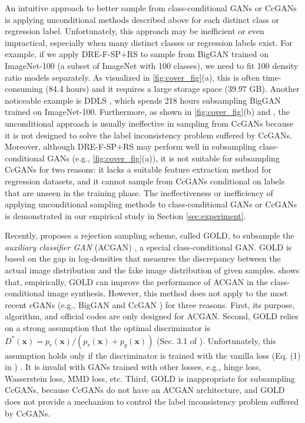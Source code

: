 \documentclass[final,12pt, 3p,times]{elsarticle}
\begin{document}
An intuitive approach to better sample from class-conditional GANs or CcGANs is applying unconditional methods described above for each distinct class or regression label. Unfortunately, this approach may be inefficient or even impractical, especially when many distinct classes or regression labels exist. For example, if we apply DRE-F-SP+RS \cite{ding2020subsampling} to sample from BigGAN \cite{brock2018large} trained on ImageNet-100 \cite{cao2017hashnet} (a subset of ImageNet \cite{imagenet_cvpr09} with 100 classes), we need to fit 100 density ratio models separately. As visualized in \cref{fig:cover_fig}(a), this is often time-consuming (84.4 hours) and it requires a large storage space ($39.97$ GB). Another noticeable example is DDLS \cite{che2020your}, which spends 218 hours subsampling BigGAN trained on ImageNet-100. Furthermore, as shown in \cref{fig:cover_fig}(b) and , the unconditional approach is usually ineffective in sampling from CcGANs because it is not designed to solve the label inconsistency problem suffered by CcGANs. Moreover, although DRE-F-SP+RS may perform well in subsampling class-conditional GANs (e.g., \cref{fig:cover_fig}(a)), it is not suitable for subsampling CcGANs for two reasons: it lacks a suitable feature extraction method for regression datasets, and it cannot sample from CcGANs conditional on labels that are unseen in the training phase. The ineffectiveness or inefficiency of applying unconditional sampling methods to class-conditional GANs or CcGANs is demonstrated in our empirical study in Section \ref{sec:experiment}.

Recently, \cite{mo2019mining} proposes a rejection sampling scheme, called GOLD, to subsample the \textit{auxiliary classifier GAN} (ACGAN) \cite{odena2017conditional}, a special class-conditional GAN. GOLD is based on the gap in log-densities that measures the discrepancy between the actual image distribution and the fake image distribution of given samples. \cite{mo2019mining} shows that, empirically, GOLD can improve the performance of ACGAN in the class-conditional image synthesis. However, this method does not apply to the most recent cGANs (e.g., BigGAN \cite{brock2018large} and CcGAN \cite{ding2021ccgan, ding2020continuous}) for three reasons. First, its purpose, algorithm, and official codes are only designed for ACGAN. Second, GOLD relies on a strong assumption that the optimal discriminator is $D^*(\bm{x})=p_r(\bm{x})/(p_r(\bm{x})+p_g(\bm{x}))$ (Sec. 3.1 of \cite{mo2019mining}). Unfortunately, this assumption holds only if the discriminator is trained with the vanilla loss (Eq. (1) in \cite{goodfellow2014generative}) \cite{azadi2018discriminator, goodfellow2014generative}. It is invalid with GANs trained with other losses, e.g., hinge loss, Wasserstein loss, MMD loss, etc. Third, GOLD is inappropriate for subsampling CcGANs, because CcGANs do not have an ACGAN architecture, and GOLD does not provide a mechanism to control the label inconsistency problem suffered by CcGANs.
\end{document}
